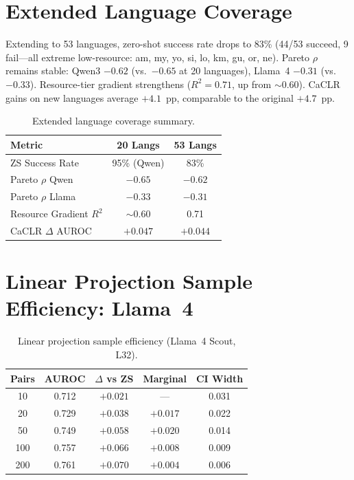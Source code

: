 \documentclass[11pt,a4paper]{article}
\begin{document}
\section{Extended Language Coverage}
\label{app:extended}

Extending to 53 languages, zero-shot success rate drops to 83\% (44/53 succeed, 9 fail---all extreme low-resource: am, my, yo, si, lo, km, gu, or, ne).
Pareto $\rho$ remains stable: Qwen3 $-0.62$ (vs.\ $-0.65$ at 20 languages), Llama~4 $-0.31$ (vs.\ $-0.33$).
Resource-tier gradient strengthens ($R^2 = 0.71$, up from $\sim$0.60).
CaCLR gains on new languages average $+4.1$~pp, comparable to the original $+4.7$~pp.

\begin{table}[h]
\centering
\caption{Extended language coverage summary.}
\label{tab:extended}
\small
\begin{tabular}{lcc}
\toprule
\textbf{Metric} & \textbf{20 Langs} & \textbf{53 Langs} \\
\midrule
ZS Success Rate    & 95\% (Qwen) & 83\% \\
Pareto $\rho$ Qwen & $-0.65$ & $-0.62$ \\
Pareto $\rho$ Llama& $-0.33$ & $-0.31$ \\
Resource Gradient $R^2$ & $\sim$0.60 & 0.71 \\
CaCLR $\Delta$ AUROC    & $+0.047$ & $+0.044$ \\
\bottomrule
\end{tabular}
\end{table}

\section{Linear Projection Sample Efficiency: Llama~4}
\label{app:linproj_llama}

\begin{table}[h]
\centering
\caption{Linear projection sample efficiency (Llama~4 Scout, L32).}
\label{tab:linproj_llama}
\small
\begin{tabular}{ccccc}
\toprule
\textbf{Pairs} & \textbf{AUROC} & \textbf{$\Delta$ vs ZS} & \textbf{Marginal} & \textbf{CI Width} \\
\midrule
10  & 0.712 & $+0.021$ & --- & 0.031 \\
20  & 0.729 & $+0.038$ & $+0.017$ & 0.022 \\
50  & 0.749 & $+0.058$ & $+0.020$ & 0.014 \\
100 & 0.757 & $+0.066$ & $+0.008$ & 0.009 \\
200 & 0.761 & $+0.070$ & $+0.004$ & 0.006 \\
\bottomrule
\end{tabular}
\end{table}
\end{document}
